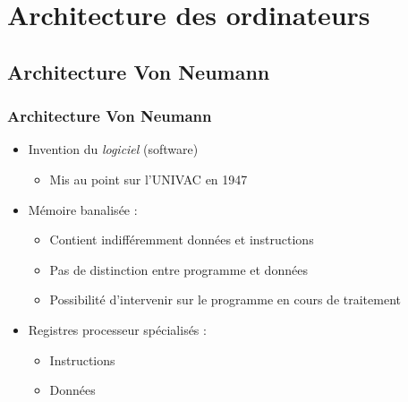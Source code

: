 \section{Architecture des ordinateurs}

\subsection{Architecture Von Neumann}

\begin{frame}
\frametitle{Architecture Von Neumann}
\begin{itemize}
\item Invention du \emph{logiciel} (software)
\begin{itemize}
\item Mis au point sur l'UNIVAC en 1947
\end{itemize}
\item Mémoire banalisée :
\begin{itemize}
\item Contient indifféremment données et instructions
\item Pas de distinction entre programme et données
\item Possibilité d'intervenir sur le programme en cours de traitement
\end{itemize}
\item Registres processeur spécialisés :
\begin{itemize}
\item Instructions
\item Données
\end{itemize}
\end{itemize}
\end{frame}



